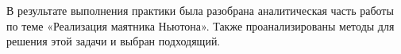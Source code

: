 \Conclusion %

В результате выполнения практики была разобрана аналитическая часть работы по теме  «Реализация маятника Ньютона». Также проанализированы методы для решения этой задачи и выбран подходящий.

